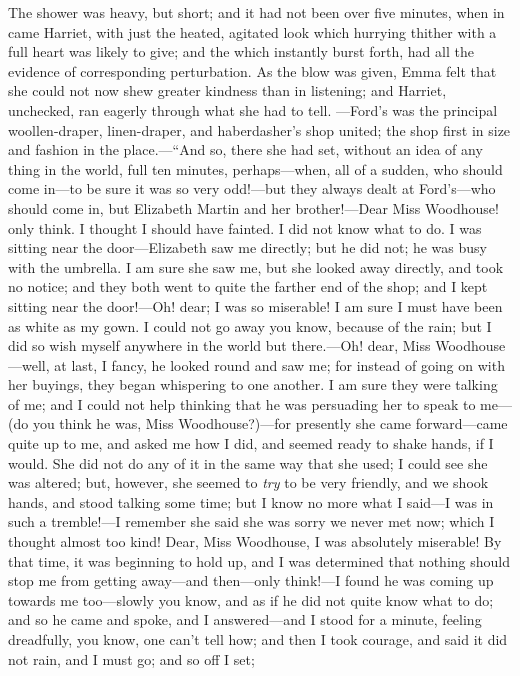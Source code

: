 The shower was heavy, but short; and it had not been over five minutes, when in came Harriet, with just the heated, agitated look which hurrying thither with a full heart was likely to give; and the  which instantly burst forth, had all the evidence of corresponding perturbation. As the blow was given, Emma felt that she could not now shew greater kindness than in listening; and Harriet, unchecked, ran eagerly through what she had to tell. ---Ford's was the principal woollen-draper, linen-draper, and haberdasher's shop united; the shop first in size and fashion in the place.---“And so, there she had set, without an idea of any thing in the world, full ten minutes, perhaps---when, all of a sudden, who should come in---to be sure it was so very odd!---but they always dealt at Ford's---who should come in, but Elizabeth Martin and her brother!---Dear Miss Woodhouse! only think. I thought I should have fainted. I did not know what to do. I was sitting near the door---Elizabeth saw me directly; but he did not; he was busy with the umbrella. I am sure she saw me, but she looked away directly, and took no notice; and they both went to quite the farther end of the shop; and I kept sitting near the door!---Oh! dear; I was so miserable! I am sure I must have been as white as my gown. I could not go away you know, because of the rain; but I did so wish myself anywhere in the world but there.---Oh! dear, Miss Woodhouse---well, at last, I fancy, he looked round and saw me; for instead of going on with her buyings, they began whispering to one another. I am sure they were talking of me; and I could not help thinking that he was persuading her to speak to me---(do you think he was, Miss Woodhouse?)---for presently she came forward---came quite up to me, and asked me how I did, and seemed ready to shake hands, if I would. She did not do any of it in the same way that she used; I could see she was altered; but, however, she seemed to {\em try} to be very friendly, and we shook hands, and stood talking some time; but I know no more what I said---I was in such a tremble!---I remember she said she was sorry we never met now; which I thought almost too kind! Dear, Miss Woodhouse, I was absolutely miserable! By that time, it was beginning to hold up, and I was determined that nothing should stop me from getting away---and then---only think!---I found he was coming up towards me too---slowly you know, and as if he did not quite know what to do; and so he came and spoke, and I answered---and I stood for a minute, feeling dreadfully, you know, one can't tell how; and then I took courage, and said it did not rain, and I must go; and so off I set; 